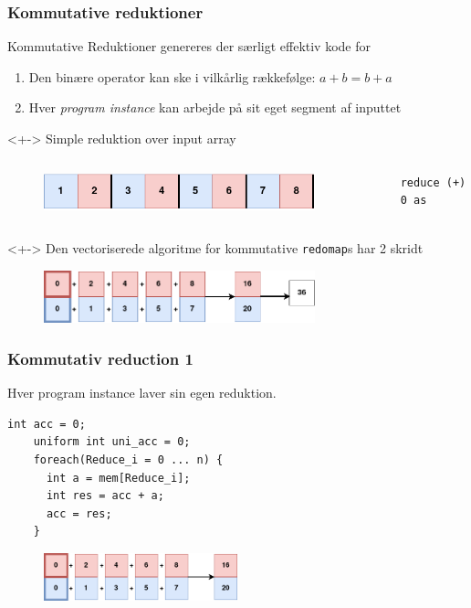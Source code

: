 \documentclass[t]{beamer}
\begin{document}
\begin{frame}[fragile]
  \frametitle{Kommutative reduktioner}
  \begin{block}{Kommutative Reduktioner genereres der særligt effektiv kode for}
  \begin{enumerate}
    \item Den binære operator kan ske i vilkårlig rækkefølge: $a + b = b + a$
    \item Hver \textit{program instance} kan arbejde på sit eget segment af inputtet
  \end{enumerate}
\end{block}
\begin{onlyenv}<+->
  Simple reduktion over input array
  \begin{columns}
  \begin{figure}[H]
  \centering
  \includegraphics[width=0.9\textwidth]{imgs/input.png}
\end{figure}

  \begin{lstlisting}[language=futhark]
    reduce (+) 0 as
  \end{lstlisting}

\end{columns}
\end{onlyenv}
\begin{onlyenv}<+->
  Den vectoriserede algoritme for kommutative \texttt{redomap}s har 2 skridt
  \begin{figure}[h!]
    \centering
    \includegraphics[width=0.7\textwidth]{imgs/kom_reduction.png}
  \end{figure}
\end{onlyenv}
\end{frame}
\begin{frame}[fragile]
  \frametitle{Kommutativ reduction 1}
  Hver program instance laver sin egen reduktion.
\begin{lstlisting}[language=ispc]
    int acc = 0;
    uniform int uni_acc = 0;
    foreach(Reduce_i = 0 ... n) {
      int a = mem[Reduce_i];
      int res = acc + a;
      acc = res;
    }
\end{lstlisting}

  \begin{figure}[H]
    \centering
    \includegraphics[width=0.5\textwidth]{imgs/kom_reduce1.png}
  \end{figure}
  \begin{center}
  \end{center}
\end{frame}
\end{document}
